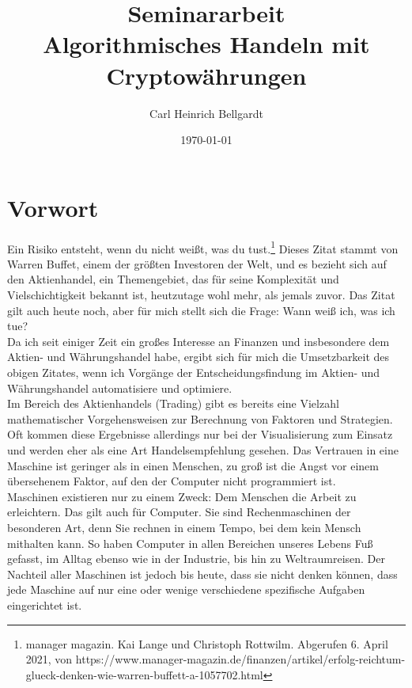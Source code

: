 \documentclass[12pt]{article}
\begin{document}
\begin{titlepage}	
	\title{\LARGE Seminararbeit\\ \large Algorithmisches Handeln mit Cryptowährungen}
	\date{\small \today}
	\author{\small Carl Heinrich Bellgardt}	
	\clearpage\maketitle
	\thispagestyle{empty}
\end{titlepage}

\setcounter{page}{2}
\tableofcontents
\pagebreak
\section{Vorwort}
	\glqq Ein Risiko entsteht, wenn du nicht weißt, was du tust.\grqq{}\footnote{manager magazin. Kai Lange und Christoph Rottwilm. Abgerufen 6. April 2021, von https://www.manager-magazin.de/finanzen/artikel/erfolg-reichtum-glueck-denken-wie-warren-buffett-a-1057702.html} Dieses Zitat stammt von Warren Buffet, einem der größten Investoren der Welt, und es bezieht sich auf den Aktienhandel, ein Themengebiet, das für seine Komplexität und Vielschichtigkeit bekannt ist, heutzutage wohl mehr, als jemals zuvor. Das Zitat gilt auch heute noch, aber für mich stellt sich die Frage: Wann weiß ich, was ich tue?\\
	Da ich seit einiger Zeit ein großes Interesse an Finanzen und insbesondere dem Aktien- und Währungshandel habe, ergibt sich für mich die Umsetzbarkeit des obigen Zitates, wenn ich Vorgänge der Entscheidungsfindung im Aktien- und Währungshandel automatisiere und optimiere.\\
	Im Bereich des Aktienhandels (Trading) gibt es bereits eine Vielzahl mathematischer Vorgehensweisen zur Berechnung von Faktoren und Strategien. Oft kommen diese Ergebnisse allerdings nur bei der Visualisierung zum Einsatz und werden eher als eine Art Handelsempfehlung gesehen. Das Vertrauen in eine Maschine ist geringer als in einen Menschen, zu groß ist die Angst vor einem übersehenem Faktor, auf den der Computer nicht programmiert ist.\\
	Maschinen existieren nur zu einem Zweck: Dem Menschen die Arbeit zu erleichtern. Das gilt auch für Computer. Sie sind Rechenmaschinen der besonderen Art, denn Sie rechnen in einem Tempo, bei dem kein Mensch mithalten kann. So haben Computer in allen Bereichen unseres Lebens Fuß gefasst, im Alltag ebenso wie in der Industrie, bis hin zu Weltraumreisen. Der Nachteil aller Maschinen ist jedoch bis heute, dass sie nicht denken können, dass jede Maschine auf nur eine oder wenige verschiedene spezifische Aufgaben eingerichtet ist.\\
\end{document}
